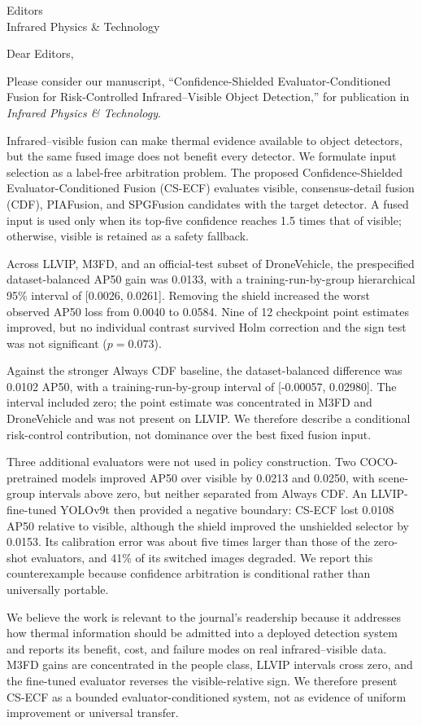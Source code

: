 \documentclass[a4paper,10pt]{letter}
\begin{document}
\sloppy
\begin{letter}{Editors\\Infrared Physics \& Technology}
\opening{Dear Editors,}

Please consider our manuscript, ``Confidence-Shielded
Evaluator-Conditioned Fusion for Risk-Controlled Infrared--Visible Object
Detection,'' for publication in \emph{Infrared Physics \& Technology}.

Infrared--visible fusion can make thermal evidence available to object
detectors, but the same fused image does not benefit every detector. We
formulate input selection as a label-free arbitration problem. The proposed
Confidence-Shielded Evaluator-Conditioned Fusion (CS-ECF) evaluates visible,
consensus-detail fusion (CDF), PIAFusion, and SPGFusion candidates with the
target detector. A fused input is used only when its top-five confidence reaches
1.5 times that of visible; otherwise, visible is retained as a safety fallback.

Across LLVIP, M3FD, and an official-test subset of DroneVehicle, the
prespecified dataset-balanced AP50 gain was 0.0133, with a
training-run-by-group hierarchical 95\% interval of [0.0026, 0.0261].
Removing the shield increased the worst observed AP50 loss from 0.0040 to
0.0584. Nine of 12 checkpoint point estimates improved, but no individual
contrast survived Holm correction and the sign test was not significant
(\(p=0.073\)).

Against the stronger Always CDF baseline, the dataset-balanced difference was
0.0102 AP50, with a training-run-by-group interval of [-0.00057, 0.02980].
The interval included zero; the point estimate was concentrated in M3FD and
DroneVehicle and was not present on LLVIP. We therefore describe a
conditional risk-control contribution, not dominance over the best fixed fusion
input.

Three additional evaluators were not used in policy construction. Two
COCO-pretrained models improved AP50 over visible by 0.0213 and 0.0250, with
scene-group intervals above zero, but neither separated from Always CDF. An
LLVIP-fine-tuned YOLOv9t then provided a negative boundary: CS-ECF lost 0.0108
AP50 relative to visible, although the shield improved the unshielded selector
by 0.0153. Its calibration error was about five times larger than those of the
zero-shot evaluators, and 41\% of its switched images degraded. We report this
counterexample because confidence arbitration is conditional rather than
universally portable.

We believe the work is relevant to the journal's readership because it addresses
how thermal information should be admitted into a deployed detection system and
reports its benefit, cost, and failure modes on real infrared--visible data.
M3FD gains are concentrated in the people class, LLVIP intervals cross zero,
and the fine-tuned evaluator reverses the visible-relative sign. We therefore
present CS-ECF as a bounded evaluator-conditioned system, not as evidence of
uniform improvement or universal transfer.


\end{letter}
\end{document}
